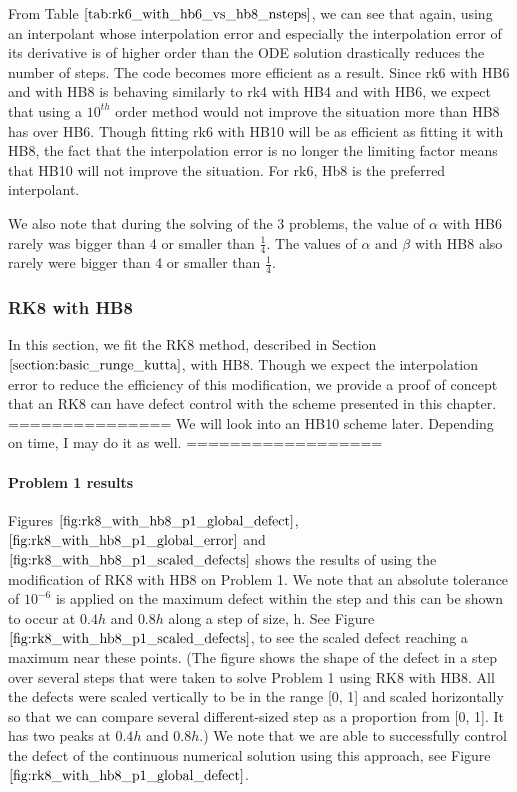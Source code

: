 \documentclass{article}
\begin{document}
From Table $\ref{tab:rk6_with_hb6_vs_hb8_nsteps}$, we can see that again, using an interpolant whose interpolation error and especially the interpolation error of its derivative is of higher order than the ODE solution drastically reduces the number of steps. The code becomes more efficient as a result. Since rk6 with HB6 and with HB8 is behaving similarly to rk4 with HB4 and with HB6, we expect that using a $10^{th}$ order method would not improve the situation more than HB8 has over HB6. Though fitting rk6 with HB10 will be as efficient as fitting it with HB8, the fact that the interpolation error is no longer the limiting factor means that HB10 will not improve the situation. For rk6, Hb8 is the preferred interpolant.  

We also note that during the solving of the 3 problems, the value of $\alpha$ with HB6 rarely was bigger than 4 or smaller than $\frac{1}{4}$. The values of $\alpha$ and $\beta$ with HB8 also rarely were bigger than 4 or smaller than $\frac{1}{4}$. 

\subsubsection{RK8 with HB8}
In this section, we fit the RK8 method, described in Section $\ref{section:basic_runge_kutta}$, with HB8. Though we expect the interpolation error to reduce the efficiency of this modification, we provide a proof of concept that an RK8 can have defect control with the scheme presented in this chapter. 
===============
We will look into an HB10 scheme later. Depending on time, I may do it as well.
==================
\paragraph{Problem 1 results}
Figures $\ref{fig:rk8_with_hb8_p1_global_defect}$, $\ref{fig:rk8_with_hb8_p1_global_error}$ and $\ref{fig:rk8_with_hb8_p1_scaled_defects}$ shows the results of using the modification of RK8 with HB8 on Problem 1. We note that an absolute tolerance of $10^{-6}$ is applied on the maximum defect within the step and this can be shown to occur at $0.4h$ and $0.8h$ along a step of size, h. See Figure $\ref{fig:rk8_with_hb8_p1_scaled_defects}$, to see the scaled defect reaching a maximum near these points. (The figure shows the shape of the defect in a step over several steps that were taken to solve Problem 1 using RK8 with HB8. All the defects were scaled vertically to be in the range [0, 1] and scaled horizontally so that we can compare several different-sized step as a proportion from [0, 1]. It has two peaks at $0.4h$ and $0.8h$.) We note that we are able to successfully control the defect of the continuous numerical solution using this approach, see Figure $\ref{fig:rk8_with_hb8_p1_global_defect}$. 
 
\end{document}
